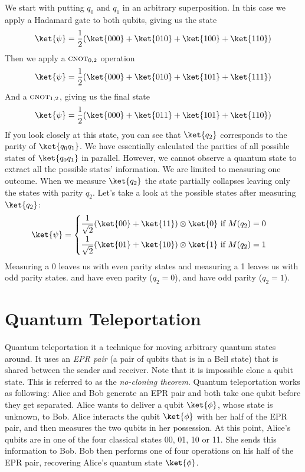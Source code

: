 \documentclass[11pt, notitlepage]{report}
\begin{document}
\noindent
We start with putting $q_0$ and $q_1$ in an arbitrary superposition. In this case we apply a Hadamard gate to both qubits, giving us the state
\[
  \ket{\psi} = \dfrac{1}{2}(\ket{000} + \ket{010} + \ket{100} + \ket{110})
\]
Then we apply a $\textsc{cnot}_{0,2}$ operation
\[
  \ket{\psi} = \dfrac{1}{2}(\ket{000} + \ket{010} + \ket{101} + \ket{111})
\]
And a $\textsc{cnot}_{1,2}$, giving us the final state
\[
  \ket{\psi} = \dfrac{1}{2}(\ket{000} + \ket{011} + \ket{101} + \ket{110})
\]
If you look closely at this state, you can see that $\ket{q_2}$ corresponds to the parity of $\ket{q_0q_1}$. We have essentially calculated the parities of all possible states of $\ket{q_0q_1}$ in parallel. However, we cannot observe a quantum state to extract all the possible states' information. We are limited to measuring one outcome. When we measure $\ket{q_2}$ the state partially collapses leaving only the states with parity $q_2$. Let's take a look at the possible states after measuring $\ket{q_2}$:
\[
\ket{\psi} = 
\begin{cases}
\begin{aligned}
\dfrac{1}{\sqrt2}(\ket{00} + \ket{11}) \otimes \ket{0} & \text{ if } M(q_2) = 0 \\
\dfrac{1}{\sqrt2}(\ket{01} + \ket{10}) \otimes \ket{1} & \text{ if } M(q_2) = 1
\end{aligned}
\end{cases}
\]
Measuring a 0 leaves us with even parity states and measuring a 1 leaves us with odd parity states.  and  have even parity ($q_2 = 0$),  and  have odd parity ($q_2 = 1$).

\section{Quantum Teleportation}
Quantum teleportation it a technique for moving arbitrary quantum states around. It uses an \emph{EPR pair} (a pair of qubits that is in a Bell state) that is shared between the sender and receiver. Note that it is impossible clone a qubit state. This is referred to as the \emph{no-cloning theorem}. Quantum teleportation works as following: Alice and Bob generate an EPR pair and both take one qubit before they get separated. Alice wants to deliver a qubit $\ket{\phi}$, whose state is unknown, to Bob. Alice interacts the qubit $\ket{\phi}$ with her half of the EPR pair, and then measures the two qubits in her possession. At this point, Alice's qubits are in one of the four classical states 00, 01, 10 or 11. She sends this information to Bob. Bob then performs one of four operations on his half of the EPR pair, recovering Alice's quantum state $\ket{\phi}$.
\end{document}
